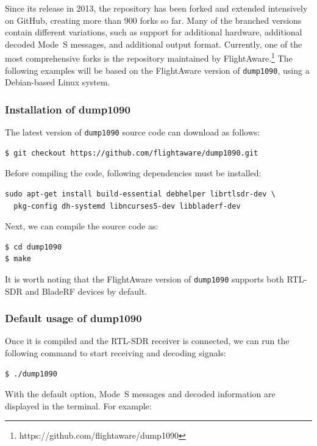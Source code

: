 Since its release in 2013, the repository has been forked and extended intensively on GitHub, creating more than 900 forks so far. Many of the branched versions contain different variations, such as support for additional hardware, additional decoded Mode~S messages, and additional output format. Currently, one of the most comprehensive forks is the repository maintained by FlightAware.\footnote{https://github.com/flightaware/dump1090} The following examples will be based on the FlightAware version of \texttt{dump1090}, using a Debian-based Linux system.

\subsubsection{Installation of dump1090}
The latest version of \texttt{dump1090} source code can download as follows:

\begin{verbatim}
$ git checkout https://github.com/flightaware/dump1090.git
\end{verbatim}

Before compiling the code, following dependencies must be installed:

\begin{verbatim}
sudo apt-get install build-essential debhelper librtlsdr-dev \
  pkg-config dh-systemd libncurses5-dev libbladerf-dev
\end{verbatim}

Next, we can compile the source code as:

\begin{verbatim}
$ cd dump1090
$ make
\end{verbatim}

It is worth noting that the FlightAware version of \texttt{dump1090} supports both RTL-SDR and BladeRF devices by default.

\subsubsection{Default usage of dump1090}

Once it is compiled and the RTL-SDR receiver is connected, we can run the following command to start receiving and decoding signals:

\begin{verbatim}
$ ./dump1090
\end{verbatim}

With the default option, Mode~S messages and decoded information are displayed in the terminal. For example:

